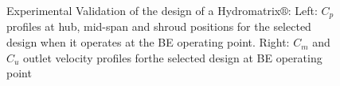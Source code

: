 

\begin{figure}[h!]
\begin{minipage}[b]{0.5\linewidth}
 \centering
\end{minipage}
\begin{minipage}[b]{0.5\linewidth}
 \centering
\end{minipage}

\caption{Experimental Validation of the design of a Hydromatrix$\circledR$: Left: $C_p$ profiles at hub, mid-span and shroud positions for the selected design when it operates at the BE operating point. Right: $C_m$ and $C_u$ outlet velocity profiles forthe selected design at BE operating point}
\label{exp.BE}
\end{figure}
 

